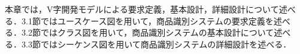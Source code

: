 

本章では，V字開発モデルによる要求定義，基本設計，詳細設計について述べる．3.1節ではユースケース図を用いて，商品識別システムの要求定義を述べる．3.2節ではクラス図を用いて，商品識別システムの基本設計について述べる．3.3節ではシーケンス図を用いて商品識別システムの詳細設計を述べる．
